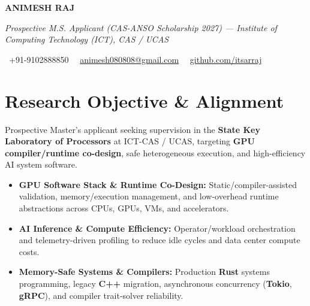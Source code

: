 \documentclass[a4paper,11pt]{article}
\newcommand{\socialicon}[1]{\raisebox{-0.05em}{\resizebox{!}{1em}{#1}}}
\newcommand{\headerfontiii}{\fontfamily{ppl}\selectfont} %
\begin{document}
\headerfontiii

\begin{center}
    {\Huge\textbf{ANIMESH RAJ}}
\end{center}
\vspace{-6mm}

\begin{center}
    {\small\textit{Prospective M.S. Applicant (CAS-ANSO Scholarship 2027) --- Institute of Computing Technology (ICT), CAS / UCAS}}
\end{center}
\vspace{-6mm}

\begin{center}
    {\small
    \socialicon{\faPhone}\ +91-9102888850 \textbar\ 
    \socialicon{\faEnvelope}\ \href{mailto:animesh080808@gmail.com}{animesh080808@gmail.com} \textbar\ 
    \socialicon{\faGithub}\ \href{https://github.com/itsarraj}{github.com/itsarraj}
    }
\end{center}
\vspace{-4mm}

\section{\textbf{Research Objective \& Alignment}}
\vspace{1mm}
{\small
Prospective Master's applicant seeking supervision in the \textbf{State Key Laboratory of Processors} at ICT-CAS / UCAS, targeting \textbf{GPU compiler/runtime co-design}, safe heterogeneous execution, and high-efficiency AI system software.
\begin{itemize}[leftmargin=3ex, itemsep=0.4mm, topsep=1mm]
    \item \textbf{GPU Software Stack \& Runtime Co-Design:} Static/compiler-assisted validation, memory/execution management, and low-overhead runtime abstractions across CPUs, GPUs, VMs, and accelerators.
    \item \textbf{AI Inference \& Compute Efficiency:} Operator/workload orchestration and telemetry-driven profiling to reduce idle cycles and data center compute costs.
    \item \textbf{Memory-Safe Systems \& Compilers:} Production \textbf{Rust} systems programming, legacy \textbf{C++} migration, asynchronous concurrency (\textbf{Tokio}, \textbf{gRPC}), and compiler trait-solver reliability.
\end{itemize}
}
\vspace{-3mm}
\end{document}
